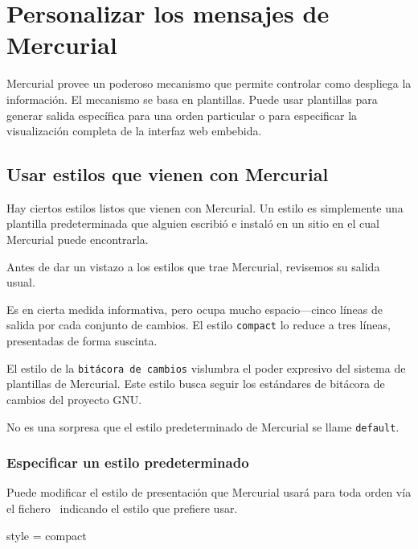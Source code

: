 \chapter{Personalizar los mensajes de Mercurial}
\label{chap:template}

Mercurial provee un poderoso mecanismo que permite controlar como
despliega la información.  El mecanismo se basa en plantillas.  Puede
usar plantillas para generar salida específica para una orden
particular o para especificar la visualización completa de la interfaz
web embebida.

\section{Usar estilos que vienen con Mercurial}
\label{sec:style}

Hay ciertos estilos listos que vienen con Mercurial.  Un estilo es
simplemente una plantilla predeterminada que alguien escribió e
instaló en un sitio en el cual Mercurial puede encontrarla.

Antes de dar un vistazo a los estilos que trae Mercurial, revisemos su
salida usual.


Es en cierta medida informativa, pero ocupa mucho espacio---cinco
líneas de salida por cada conjunto de cambios.  El estilo
\texttt{compact} lo reduce a tres líneas, presentadas de forma
suscinta.


El estilo de la \texttt{bitácora de cambios} vislumbra el poder
expresivo del sistema de plantillas de Mercurial.  Este estilo busca
seguir los estándares de bitácora de cambios del proyecto
GNU\cite{web:changelog}.


No es una sorpresa que el estilo predeterminado de Mercurial se llame
\texttt{default}.

\subsection{Especificar un estilo predeterminado}

Puede modificar el estilo de presentación que Mercurial usará para
toda orden vía el fichero \hgrc\, indicando el estilo que prefiere
usar.

\begin{codesample2}
  [ui]
  style = compact
\end{codesample2}

